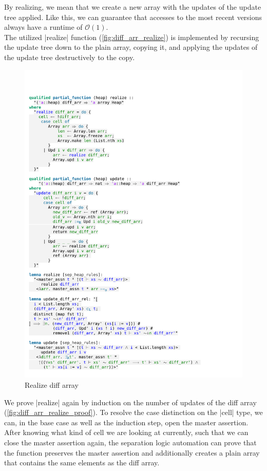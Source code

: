 \noindent By realizing, we mean that we create a new array with the updates of the update tree applied. Like this, we can guarantee that accesses to the most recent versions always have a runtime of $\mathcal{O}(1)$. \\
The utilized |realize| function (\autoref{fig:diff_arr_realize}) is implemented by recursing the update tree down to the plain array, copying it, and applying the updates of the update tree destructively to the copy.

\begin{figure}[htpb]
    \includegraphics[trim={0 19,8cm 0 2,4cm}, clip, width=1.00\textwidth]{figures/Theory_Diff_Arr_Update.pdf}
    \caption[Realize diff array]{Realize diff array}
    \label{fig:diff_arr_realize}
\end{figure}

\noindent We prove |realize| again by induction on the number of updates of the diff array (\autoref{fig:diff_arr_realize_proof}). To resolve the case distinction on the |cell| type, we can, in the base case as well as the induction step, open the master assertion. After knowing what kind of cell we are looking at currently, such that we can close the master assertion again, the separation logic automation can prove that the function preserves the master assertion and additionally creates a plain array that contains the same elements as the diff array.

